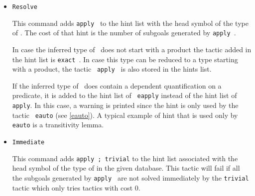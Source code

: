 \begin{itemize}
\item \texttt{Resolve} {\term} 
  
  This command adds {\tt apply {\term}} to the hint list
  with the head symbol of the type of \term. The cost of that hint is
  the number of subgoals generated by {\tt apply {\term}}.
  
  In case the inferred type of \term\ does not start with a product the
  tactic added in the hint list is {\tt exact {\term}}. In case this
  type can be reduced to a type starting with a product, the tactic {\tt
    apply {\term}} is also stored in the hints list.
  
  If the inferred type of \term\ does contain a dependent
  quantification on a predicate, it is added to the hint list of {\tt
    eapply} instead of the hint list of {\tt apply}. In this case, a
  warning is printed since the hint is only used by the tactic {\tt
    eauto} (see \ref{eauto}). A typical example of hint that is used
  only by \texttt{eauto} is a transitivity lemma.



\item \texttt{Immediate {\term}} 
  
  This command adds {\tt apply {\term}; trivial} to the hint list
  associated with the head symbol of the type of \ident in the given
  database. This tactic will fail if all the subgoals generated by
  {\tt apply {\term}} are not solved immediately by the {\tt trivial}
  tactic which only tries tactics with cost $0$.
  

\end{itemize}
